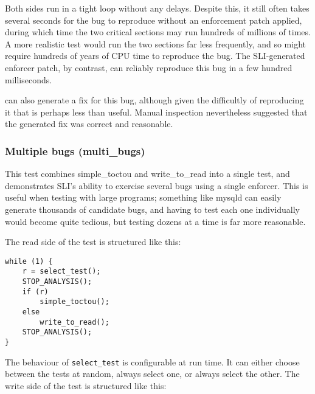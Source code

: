 Both sides run in a tight loop without any delays.  Despite this, it
still often takes several seconds for the bug to reproduce without an
enforcement patch applied, during which time the two critical sections
may run hundreds of millions of times.  A more realistic test would
run the two sections far less frequently, and so might require
hundreds of years of CPU time to reproduce the bug.  The SLI-generated
enforcer patch, by contrast, can reliably reproduce this bug in a few
hundred milliseconds.

{\Technique} can also generate a fix for this bug, although given the
difficultly of reproducing it that is perhaps less than useful.
Manual inspection nevertheless suggested that the generated fix was
correct and reasonable.


\subsubsection{Multiple bugs (multi\_bugs)}

This test combines simple\_toctou and write\_to\_read into a single
test, and demonstrates SLI's ability to exercise several bugs using a
single enforcer.  This is useful when testing with large programs;
something like mysqld can easily generate thousands of candidate bugs,
and having to test each one individually would become quite tedious,
but testing dozens at a time is far more reasonable.

The read side of the test is structured like this:

\begin{verbatim}
while (1) {
    r = select_test();
    STOP_ANALYSIS();
    if (r)
        simple_toctou();
    else
        write_to_read();
    STOP_ANALYSIS();
}
\end{verbatim}

The behaviour of \verb|select_test| is configurable at run time.  It
can either choose between the tests at random, always select one, or
always select the other.  The write side of the test is structured
like this:

